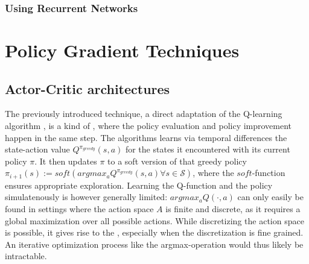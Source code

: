 \subsubsection{Using Recurrent Networks}

\section{Policy Gradient Techniques}

\subsection{Actor-Critic architectures}

The previously introduced technique, a direct adaptation of the Q-learning algorithm \cite{sutton_learning_1988}\cite{watkins_learning_1989}, is a kind of , where the policy evaluation and policy improvement happen in the same step. The algorithms learns via temporal differences the state-action value $Q^{\pi_{greedy}}(s,a)$ for the states it encountered with its current policy $\pi$. It then updates $\pi$ to a soft version of that greedy policy $\pi_{i+1}(s) := soft(argmax_a Q^{\pi_{greedy}}(s,a) \forall s \in \mathcal{S})$, where the $soft$-function ensures appropriate exploration. Learning the Q-function and the policy simulatenously is however generally limited: $argmax_aQ(\cdot, a)$ can only easily be found in settings where the action space $A$ is finite and discrete, as it requires a global maximization over all possible actions. While discretizing the action space is possible, it gives rise to the , especially when the discretization is fine grained. An iterative optimization process like the argmax-operation would thus likely be intractable.\\


